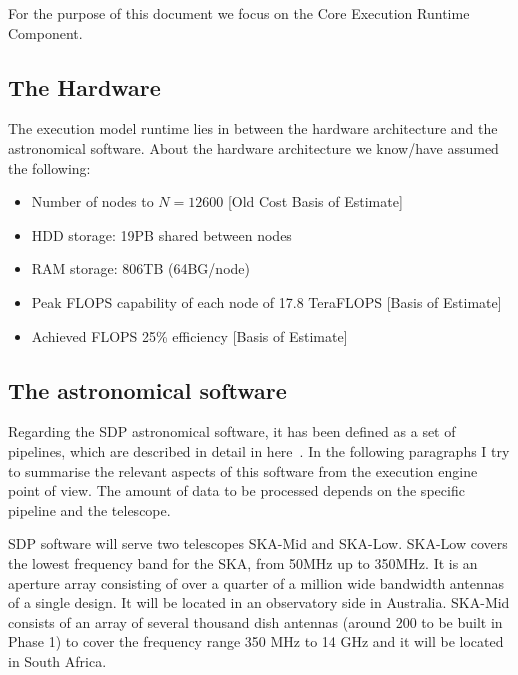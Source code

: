 For the purpose of this document we focus on the Core Execution Runtime Component.






\subsection{The Hardware}
The execution model runtime lies in between the hardware architecture and the astronomical software.
About the hardware architecture we know/have assumed the following:

\begin{itemize}
\item Number of nodes to $N=12600$  [Old Cost Basis of Estimate]
\item HDD storage: 19PB shared between nodes
\item RAM storage: 806TB (64BG/node)
\item Peak FLOPS capability of each node of 17.8 TeraFLOPS [Basis of Estimate]
\item Achieved FLOPS 25\% efficiency [Basis of Estimate]
\end{itemize}

\subsection{The astronomical software}
Regarding the SDP astronomical software, it has been defined as a set of pipelines, which are described in detail in here~\cite{SDPpipelines}.
In the following paragraphs I try to summarise the relevant aspects of this software from the execution engine point of view.
The amount of data to be processed depends on the specific pipeline and the telescope. 

SDP software will serve two telescopes SKA-Mid and SKA-Low. SKA-Low covers the lowest frequency band for the SKA, from 50MHz up to 350MHz. 
It is an aperture array consisting of over a quarter of a million wide bandwidth antennas of a single design. It will be located in an observatory side 
in Australia. SKA-Mid consists of an array of several thousand dish antennas 
(around 200 to be built in Phase 1) to cover the frequency range 350 MHz to 14 GHz and it will be located in South Africa.

